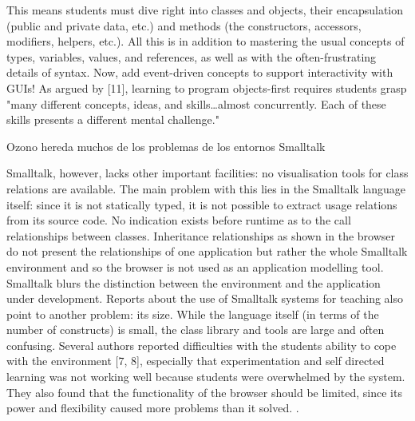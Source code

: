 \documentclass{article}
\begin{document}




This means students must dive
right into classes and objects, their encapsulation (public
and private data, etc.) and methods (the constructors,
accessors, modifiers, helpers, etc.). All this is in addition to
mastering the usual concepts of types, variables, values, and
references, as well as with the often-frustrating details of
syntax. Now, add event-driven concepts to support
interactivity with GUIs! As argued by [11], learning to
program objects-first requires students grasp "many
different concepts, ideas, and skills…almost concurrently.
Each of these skills presents a different mental challenge." \cite{cooper_teaching_2003}


Ozono hereda muchos de los problemas de los entornos Smalltalk

Smalltalk, however, lacks other important facilities: no visualisation tools for class
relations are available. The main problem with this lies in the Smalltalk language
itself: since it is not statically typed, it is not possible to extract usage relations from
its source code. No indication exists before runtime as to the call relationships
between classes. Inheritance relationships as shown in the browser do not present
the relationships of one application but rather the whole Smalltalk environment and
so the browser is not used as an application modelling tool. Smalltalk blurs the
distinction between the environment and the application under development.
Reports about the use of Smalltalk systems for teaching also point to another
problem: its size. While the language itself (in terms of the number of constructs) is
small, the class library and tools are large and often confusing. Several authors
reported difficulties with the students ability to cope with the environment [7, 8],
especially that experimentation and self directed learning was not working well
because students were overwhelmed by the system. They also found that the
functionality of the browser should be limited, since its power and flexibility caused
more problems than it solved. \cite{kolling_problem_1999}.
\end{document}
